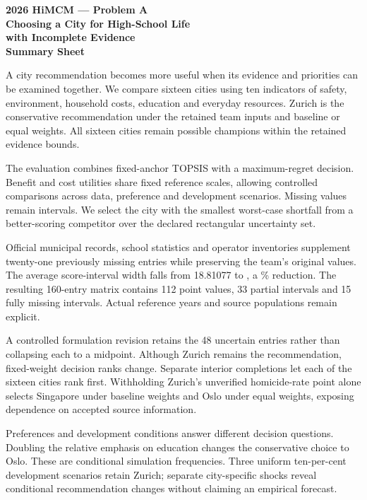 \thispagestyle{fancy}
\begin{center}
\textbf{2026 HiMCM --- Problem A}\\[9pt]
{\Large\bfseries Choosing a City for High-School Life\\with Incomplete Evidence}\\[12pt]
\textbf{Summary Sheet}
\end{center}
A city recommendation becomes more useful when its evidence and priorities can
be examined together. We compare sixteen cities using ten indicators of safety,
environment, household costs, education and everyday resources. Zurich is the
conservative recommendation under the retained team inputs and baseline or equal weights. All sixteen
cities remain possible champions within the retained evidence bounds.

The evaluation combines fixed-anchor TOPSIS with a maximum-regret decision.
Benefit and cost utilities share fixed reference scales, allowing controlled
comparisons across data, preference and development scenarios. Missing values
remain intervals. We select the city with the smallest worst-case shortfall from
a better-scoring competitor over the declared rectangular uncertainty set.

Official municipal records, school statistics and operator inventories supplement
twenty-one previously missing entries while preserving the team's original values.
The average score-interval width falls from 18.81077 to \CurrentMeanWidth{}, a \TotalWidthReduction\%
reduction. The resulting 160-entry matrix contains 112 point values, 33 partial
intervals and 15 fully missing intervals. Actual reference years and source
populations remain explicit.

A controlled formulation revision retains the 48 uncertain entries rather
than collapsing each to a midpoint. Although Zurich remains the recommendation, \RevisionRankChanges{}
fixed-weight decision ranks change. Separate interior completions let each of the sixteen cities rank first.
Withholding Zurich's unverified homicide-rate point alone selects Singapore
under baseline weights and Oslo under equal weights, exposing dependence on
accepted source information.

Preferences and development conditions answer different decision questions.
Doubling the relative emphasis on education changes the conservative choice to
Oslo. \SummaryWeightMC{} These are conditional simulation frequencies.
Three uniform ten-per-cent development scenarios retain Zurich; separate
city-specific shocks reveal conditional recommendation changes without claiming
an empirical forecast.

